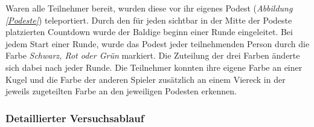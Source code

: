 \documentclass[a4paper,11pt]{article}%
\renewcommand{\\}{\vspace*{0.5\baselineskip} \newline}
\begin{document}
%

Waren alle Teilnehmer bereit, wurden diese vor ihr eigenes Podest (\textit{Abbildung \ref{Podeste}}) teleportiert. Durch den für jeden sichtbar in der Mitte der Podeste platzierten Countdown wurde der Baldige beginn einer Runde eingeleitet.
Bei jedem Start einer Runde, wurde das Podest jeder teilnehmenden Person durch die Farbe \textit{Schwarz, Rot oder Grün} markiert. Die Zuteilung der drei Farben änderte sich dabei nach jeder Runde. Die Teilnehmer konnten ihre eigene Farbe an einer Kugel und die Farbe der anderen Spieler zusätzlich an einem Viereck in der jeweils zugeteilten Farbe an den jeweiligen Podesten erkennen. 

	\subsubsection{Detaillierter Versuchsablauf}
\end{document}
